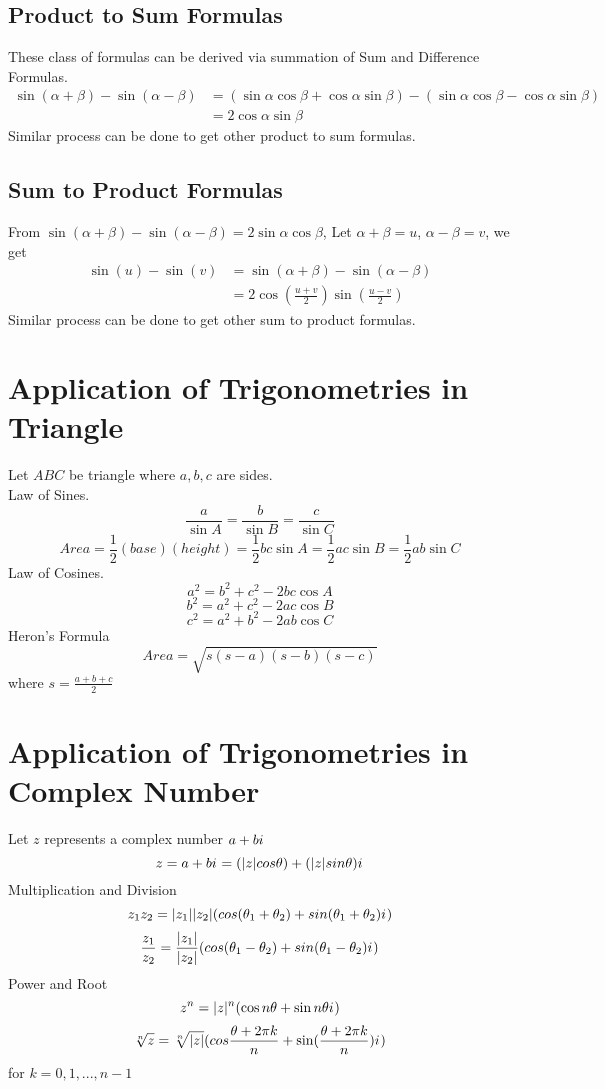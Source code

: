 \documentclass[a4paper,12pt]{article}
\newcommand{\im}{{i\mkern1mu}}
\begin{document}
\subsection{Product to Sum Formulas}
These class of formulas can be derived via summation of Sum and Difference Formulas.
\begin{align*}
	\sin(\alpha+\beta)-\sin(\alpha-\beta)&=(\sin\alpha\cos\beta+\cos\alpha\sin\beta)-(\sin\alpha\cos\beta-\cos\alpha\sin\beta) \\
	&=2\cos\alpha\sin\beta
\end{align*}
Similar process can be done to get other product to sum formulas.

\subsection{Sum to Product Formulas}
From $\sin(\alpha+\beta)-\sin(\alpha-\beta)=2\sin\alpha\cos\beta$, Let $\alpha+\beta=u$, $\alpha-\beta=v$, we get
\begin{align*}
	\sin(u)-\sin(v)&=\sin(\alpha+\beta)-\sin(\alpha-\beta) \\
	&=2\cos(\frac{u+v}{2})\sin(\frac{u-v}{2})
\end{align*}
Similar process can be done to get other sum to product formulas.


\section{Application of Trigonometries in Triangle}
Let $ABC$ be triangle where $a, b, c$ are sides.\\
Law of Sines.
$$\frac{a}{\sin A} =\frac{b}{\sin B}=\frac{c}{\sin C} $$
$$Area=\frac{1}{2}(base)(height)=\frac{1}{2}bc\sin A=\frac{1}{2}ac\sin B=\frac{1}{2}ab\sin C$$
Law of Cosines.
$$a^2=b^2+c^2-2bc\cos A$$
$$b^2=a^2+c^2-2ac\cos B$$
$$c^2=a^2+b^2-2ab\cos C$$
Heron's Formula
$$Area=\sqrt{s(s-a)(s-b)(s-c)}$$ where $s=\frac{a+b+c}{2}$


\section{Application of Trigonometries in Complex Number}
Let $z$ represents a complex number $a+b\im$
$$z=a+b\im=(|z|cos\theta)+(|z|sin\theta)\im$$
Multiplication and Division
$$z_1z_2=|z_1||z_2|(cos(\theta_1+\theta_2)+sin(\theta_1+\theta_2)\im)$$
$$\frac{z_1}{z_2}=\frac{|z_1|}{|z_2|}(cos(\theta_1-\theta_2)+sin(\theta_1-\theta_2)\im)$$
Power and Root
$$z^n=|z|^n(\cos n\theta+\sin n\theta \im)$$
$$\sqrt[n]{z}=\sqrt[n]{|z|}(cos\frac{\theta+2\pi k}{n}+\sin(\frac{\theta+2\pi k}{n})\im)$$ for $k=0,1,...,n-1$
\end{document}
